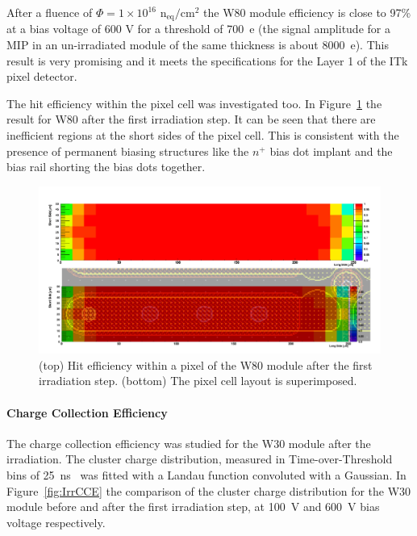 After a fluence of $\Phi=1\times 10^{16}$ n$_\text{eq}/\text{cm}^2$ the W80 module efficiency is close to 97\%  at a bias voltage of 600 V for a threshold of 700~e (the signal amplitude 
for a MIP in an un-irradiated module of the same thickness is about 8000~e). This result is very 
promising and it meets  the specifications for the Layer 1 of the ITk pixel detector.



The hit efficiency within the pixel cell was investigated too. In Figure~\ref{fig:NPTW80InpixelEff.pdf} 
the result for W80 after the first irradiation step. It can be seen that there are inefficient regions 
at the short sides of the pixel cell. This is consistent with the presence of permanent biasing structures 
like the $n^+$ bias dot implant and the bias rail shorting the bias dots together.

\begin{figure}[!htpb]
\centering
\includegraphics[width=1.00\textwidth]{NPTW80InpixelEff.pdf}
\caption{\label{fig:NPTW80InpixelEff.pdf} (top) Hit efficiency within a pixel of the W80 module after the first irradiation step. (bottom) The pixel cell layout is superimposed.}
\end{figure}

\paragraph{Charge Collection Efficiency}

The charge collection efficiency was studied for the W30 module after the  irradiation. The cluster charge distribution, measured in Time-over-Threshold bins of 25~ns~\cite{FEI4} was 
fitted with a Landau function convoluted with a Gaussian. In Figure~\ref{fig:IrrCCE} the comparison 
of the cluster charge distribution for the W30 module before and after the first irradiation step, at 100~V and 600~V 
bias voltage respectively.

